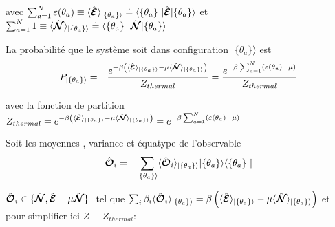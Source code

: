 	avec $  \sum_{a=1}^N  \varepsilon ( \theta_a ) \equiv \langle \operator{\mathcal{E}} \rangle_{\vert \{\theta_a \} \rangle}  \doteq  \langle \{ \theta_a \} \vert  \operator{ \mathcal{E}}  \vert \{ \theta_a\}\rangle $ et $\sum_{a=1}^N  1  \equiv \langle \operator{\mathcal{N}} \rangle_{\vert \{\theta_a \} \rangle}  \doteq  \langle \{ \theta_a \} \vert  \operator{\mathcal{N}}  \vert \{ \theta_a\}\rangle $

	
	La probabilité que le système soit dans configuration $\vert \{ \theta_a \}\rangle $  est 
	\begin{eqnarray}
		P_{\vert \{\theta_a \} \rangle} & = & \frac{e^{- \beta \left ( \langle \hat{\bm{\mathcal{E}}} \rangle_{\vert \{\theta_a \} \rangle}   - \mu \langle \hat{\bm{\mathcal{N}}} \rangle_{\vert \{\theta_a \} \rangle} \right )}}{Z_{thermal}} = \frac{e^{- \beta \sum_{a=1}^N  ( \varepsilon( \theta_a )   - \mu  )}}{Z_{thermal}}	
	\end{eqnarray}
	
	avec la fonction de partition $Z_{thermal} = e^{- \beta \left ( \langle \hat{\bm{\mathcal{E}}} \rangle_{\vert \{\theta_a \} \rangle}   - \mu \langle \hat{\bm{\mathcal{N}}} \rangle_{\vert \{\theta_a \} \rangle} \right )} =  e^{- \beta \sum_{a=1}^N  ( \varepsilon( \theta_a )   - \mu  )}$
	
	Soit les moyennes , variance et équatype de l'observable 
	\begin{eqnarray}
		\operator{\mathcal{O}}_i & = & \sum_{\vert \{\theta_a \} \rangle} \langle \operator{\mathcal{O}}_i \rangle_{\vert \{\theta_a \} \rangle}  \vert \{ \theta_a\}\rangle	\langle \{ \theta_a \} \vert
	\end{eqnarray}
	
	$\operator{\mathcal{O}}_i \in \{\operator{\mathcal{N}} , \operator{\mathcal{E}} - \mu \operator{\mathcal{N}} \} $  tel que $\sum_i \beta_i \langle \hat{\bm{\mathcal{O}}}_i \rangle_{\vert \{\theta_a \} \rangle} = \beta \left ( \langle \hat{\bm{\mathcal{E}}} \rangle_{\vert \{\theta_a \} \rangle}   - \mu \langle \hat{\bm{\mathcal{N}}} \rangle_{\vert \{\theta_a \} \rangle} \right ) $ et pour simplifier ici $Z \equiv Z_{thermal}$:
	
